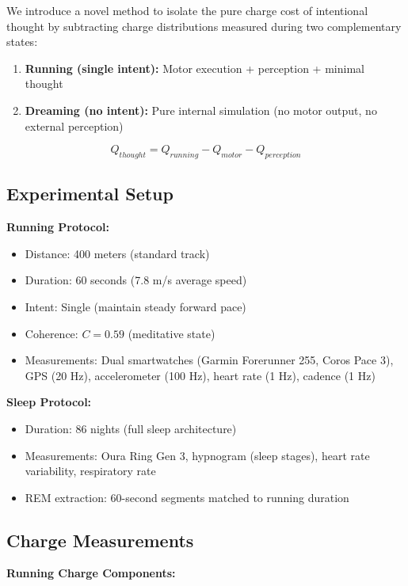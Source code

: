 \documentclass[12pt,a4paper]{article}
\begin{document}
We introduce a novel method to isolate the pure charge cost of intentional thought by subtracting charge distributions measured during two complementary states:

\begin{enumerate}
\item \textbf{Running (single intent):} Motor execution + perception + minimal thought
\item \textbf{Dreaming (no intent):} Pure internal simulation (no motor output, no external perception)
\end{enumerate}

\begin{equation}
Q_{thought} = Q_{running} - Q_{motor} - Q_{perception}
\end{equation}

\subsection{Experimental Setup}

\textbf{Running Protocol:}
\begin{itemize}
\item Distance: 400 meters (standard track)
\item Duration: 60 seconds (7.8 m/s average speed)
\item Intent: Single (maintain steady forward pace)
\item Coherence: $C = 0.59$ (meditative state)
\item Measurements: Dual smartwatches (Garmin Forerunner 255, Coros Pace 3), GPS (20 Hz), accelerometer (100 Hz), heart rate (1 Hz), cadence (1 Hz)
\end{itemize}

\textbf{Sleep Protocol:}
\begin{itemize}
\item Duration: 86 nights (full sleep architecture)
\item Measurements: Oura Ring Gen 3, hypnogram (sleep stages), heart rate variability, respiratory rate
\item REM extraction: 60-second segments matched to running duration
\end{itemize}

\subsection{Charge Measurements}

\textbf{Running Charge Components:}
\end{document}
